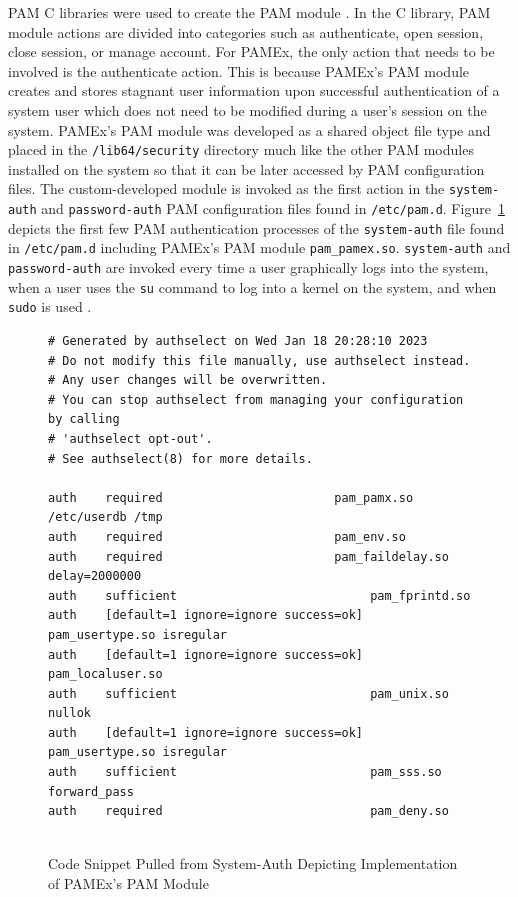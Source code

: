 PAM C libraries were used to create the PAM module \cite{man7pam}. In the C library, PAM 
module actions are divided into categories such as authenticate, open session, 
close session, or manage account. For PAMEx, the only action that needs 
to be involved is the authenticate action. This is because PAMEx’s PAM 
module creates and stores stagnant user information upon successful 
authentication of a system user which does not need to be modified 
during a user’s session on the system. PAMEx’s PAM module was developed 
as a shared object file type and placed in the \texttt{/lib64/security} 
directory much like the other PAM modules installed on the system so that it can be later accessed by PAM configuration files. 
The custom-developed module is invoked as the first 
action in the \texttt{system-auth} and \texttt{password-auth} PAM configuration files found in 
\texttt{/etc/pam.d}. Figure~\ref{system-auth} depicts the first few PAM authentication 
processes of the \texttt{system-auth} file found in \texttt{/etc/pam.d} including PAMEx's PAM module \texttt{pam\_pamex.so}. 
\texttt{system-auth} and \texttt{password-auth} are invoked every time a user graphically 
logs into the system, when a user uses the \texttt{su} command to log into a 
kernel on the system, and when \texttt{sudo} is used \cite{lauber}.

\begin{figure}[h]
    \centering
    \begin{tcolorbox}[width=\textwidth, boxsep=5pt, sharp corners, colback=white, colframe=black, fontupper=\footnotesize\ttfamily] %
        \begin{minipage}{\textwidth} %
            \begin{lstlisting}
# Generated by authselect on Wed Jan 18 20:28:10 2023
# Do not modify this file manually, use authselect instead. 
# Any user changes will be overwritten.
# You can stop authselect from managing your configuration by calling 
# 'authselect opt-out'.
# See authselect(8) for more details.

auth    required                        pam_pamx.so /etc/userdb /tmp
auth    required                        pam_env.so
auth    required                        pam_faildelay.so delay=2000000
auth    sufficient                           pam_fprintd.so
auth    [default=1 ignore=ignore success=ok] pam_usertype.so isregular
auth    [default=1 ignore=ignore success=ok] pam_localuser.so
auth    sufficient                           pam_unix.so nullok
auth    [default=1 ignore=ignore success=ok] pam_usertype.so isregular
auth    sufficient                           pam_sss.so forward_pass
auth    required                             pam_deny.so
                
            \end{lstlisting}
        \end{minipage}
    \end{tcolorbox}
    \caption[Code Snippet from system-auth File]{\label{system-auth}Code Snippet Pulled from System-Auth Depicting Implementation of PAMEx's PAM Module}
\end{figure}

